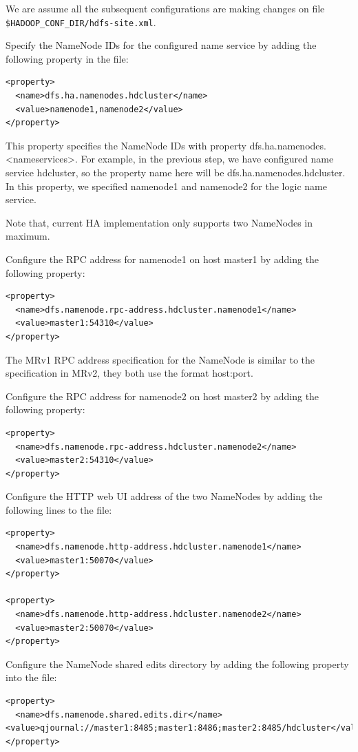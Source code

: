 We are assume all the subsequent configurations are making changes on file \verb|$HADOOP_CONF_DIR/hdfs-site.xml|.

Specify the NameNode IDs for the configured name service by adding the following property in the file:
\lstset{style=bashstyle}
\begin{lstlisting}
<property>
  <name>dfs.ha.namenodes.hdcluster</name>
  <value>namenode1,namenode2</value>
</property>
\end{lstlisting}

This property specifies the NameNode IDs with property dfs.ha.namenodes.<nameservices>. For example, in the previous step, we have configured name service hdcluster, so the property name here will be dfs.ha.namenodes.hdcluster. In this property, we specified namenode1 and namenode2 for the logic name service.

Note that, current HA implementation only supports two NameNodes in maximum.

Configure the RPC address for namenode1 on host master1 by adding the following property:
\lstset{style=bashstyle}
\begin{lstlisting}
<property>
  <name>dfs.namenode.rpc-address.hdcluster.namenode1</name>
  <value>master1:54310</value>
</property>
\end{lstlisting}

The MRv1 RPC address specification for the NameNode is similar to the specification in MRv2, they both use the format host:port.

Configure the RPC address for namenode2 on host master2 by adding the following property:
\lstset{style=bashstyle}
\begin{lstlisting}
<property>
  <name>dfs.namenode.rpc-address.hdcluster.namenode2</name>
  <value>master2:54310</value>
</property>
\end{lstlisting}

Configure the HTTP web UI address of the two NameNodes by adding the following lines to the file:
\lstset{style=bashstyle}
\begin{lstlisting}
<property>
  <name>dfs.namenode.http-address.hdcluster.namenode1</name>
  <value>master1:50070</value>
</property>

<property>
  <name>dfs.namenode.http-address.hdcluster.namenode2</name>
  <value>master2:50070</value>
</property>
\end{lstlisting}

Configure the NameNode shared edits directory by adding the following property into the file:
\lstset{style=bashstyle}
\begin{lstlisting}
<property>
  <name>dfs.namenode.shared.edits.dir</name> <value>qjournal://master1:8485;master1:8486;master2:8485/hdcluster</value>
</property>
\end{lstlisting}

